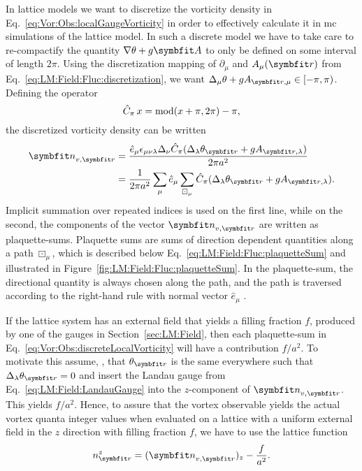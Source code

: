 In lattice models we want to discretize the vorticity density in Eq.~\eqref{eq:Vor:Obs:localGaugeVorticity} in order to effectively calculate it in \ac{mc} simulations
of the lattice model. In such a discrete model we have to take care to re-compactify the quantity $\nabla\theta+g\v{A}$ to only be defined on some interval of length $2\pi$.
Using the discretization mapping of $\partial_\mu$ and $A_\mu(\v{r})$ from Eq.~\eqref{eq:LM:Field:Fluc:discretization}, we want
$\Delta_\mu\theta + gA_{\v{r},\mu}\in[-\pi,\pi)$. Defining the operator
\begin{equation}
    \label{eq:Vor:Obs:moduloOperator}
    \hat{C}_\pi\, x = \operatorname{mod}(x+\pi,2\pi)-\pi,
\end{equation}
the discretized vorticity density can be written
\begin{equation}
    \label{eq:Vor:Obs:discreteLocalVorticity}
    \begin{split}
        \v{n}_{v,\v{r}} &= \frac{\hat{e}_\mu\epsilon_{\mu\nu\lambda}\Delta_\nu\hat{C}_\pi(\Delta_\lambda\theta_\v{r} + gA_{\v{r},\lambda})}{2\pi a^2}\\
        &= \frac{1}{2\pi a^2}\sum_\mu \hat{e}_\mu\sum_{\boxdot_\mu}\hat{C}_\pi(\Delta_\lambda\theta_\v{r} + gA_{\v{r},\lambda}).
    \end{split}
\end{equation}
Implicit summation over repeated indices is used on the first line, while on the second, the components of the vector $\v{n}_{v,\v{r}}$ are written as plaquette-sums.
Plaquette sums are sums of direction dependent quantities along a path $\boxdot_\mu$, which is described below Eq.~\eqref{eq:LM:Field:Fluc:plaquetteSum} and illustrated in
Figure~\ref{fig:LM:Field:Fluc:plaquetteSum}. In the plaquette-sum, the directional quantity is always chosen along the path, and the path is traversed according to
the right-hand rule with normal vector $\hat{e}_\mu$ \cite{Kragset08,shimizu12}.

If the lattice system has an external field that yields a filling fraction $f$, \eg produced by one of the gauges in Section~\ref{sec:LM:Field}, then each plaquette-sum
in Eq.~\eqref{eq:Vor:Obs:discreteLocalVorticity} will have a contribution $f/a^2$. To motivate this assume, \eg, that $\theta_\v{r}$ is the same everywhere such that
$\Delta_\lambda\theta_\v{r}=0$ and insert the Landau gauge from Eq.~\eqref{eq:LM:Field:LandauGauge} into the $z$-component of $\v{n}_{v,\v{r}}$. This yields $f/a^2$.
Hence, to assure that the vortex observable yields the actual vortex quanta integer values when evaluated on a lattice with a uniform external field in the $z$
direction with filling fraction $f$, we have to use the lattice function
\begin{equation}
    \label{eq:Vor:Obs:discreteLocalVorticity:fieldSubtracted}
    n^z_\v{r} = (\v{n}_{v,\v{r}})_z - \frac{f}{a^2}.
\end{equation}

